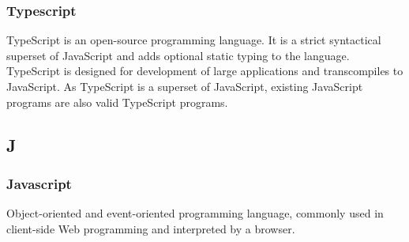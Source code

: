 		\subsubsection*{Typescript}
			TypeScript is an open-source programming language. It is a strict syntactical superset of JavaScript and adds optional static typing to the language. TypeScript is designed for development of large applications and transcompiles to JavaScript. As TypeScript is a superset of JavaScript, existing JavaScript programs are also valid TypeScript programs.
			
	
	\subsection{J}
		\subsubsection*{Javascript}
			Object-oriented and event-oriented programming language, commonly used in client-side Web programming and interpreted by a browser.